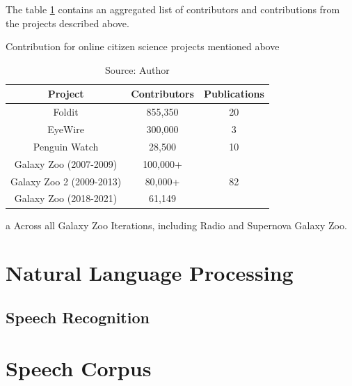 The table \ref{tab:cs-contributions} contains an aggregated list of contributors and contributions from the projects described above.

\begin{table}[h]
\centering
\begin{threeparttable}
    \caption{Contribution for online citizen science projects mentioned above}
    \small{
    \begin{tabular}{|c|c|c|}
        \hline 
        Project & Contributors & Publications \\ \hline
        Foldit & 855,350 \cite{foldit2021players} & 20 \cite{foldit2021publications} \\ \hline
        EyeWire & 300,000 \cite{eyewire2017players} & 3 \cite{eyewire2021publications} \\ \hline
        Penguin Watch & 28,500 \cite{penguin2021players} & 10 \cite{penguin2021publications} \\ \hline
        Galaxy Zoo (2007-2009) & 100,000+ \cite{lintott2011galaxy} & \multirow{3}{*}{82 \cite{galaxyzoo2021publications}\tnote{~a}} \\ \cline{1-2} 
        Galaxy Zoo 2 (2009-2013) & 80,000+ \cite{galaxyzoo22021volunteers} & \\ \cline{1-2} 
        Galaxy Zoo (2018-2021) & 61,149 \cite{galaxyzoo2021players} & \\ \hline 
    \end{tabular}}
    \begin{tablenotes}
        \item[a] Across all Galaxy Zoo Iterations, including Radio and Supernova Galaxy Zoo.
    \end{tablenotes}
\end{threeparttable}
\caption*{Source: Author}
\label{tab:cs-contributions}
\end{table}

\section{Natural Language Processing}

\subsection{Speech Recognition}

\section{Speech Corpus}

